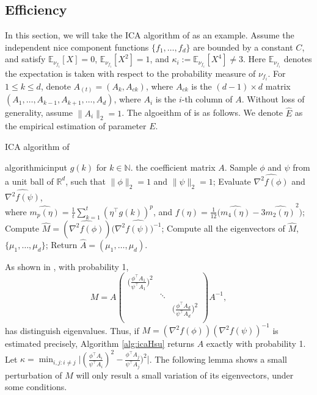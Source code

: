\documentclass[english]{article} %
\newcommand{\E}{\mathbb{E}}
\newcommand{\real}{\mathbb{R}}
\renewcommand{\natural}{\mathbb{N}}
\theoremstyle{plain}
\theoremstyle{remark}
\theoremstyle{claim}
\theoremstyle{plain}
\begin{document}
\subsection{Efficiency}
In this section, we will take the ICA algorithm of \citet{DHsu2012} as an example. 
Assume the independent nice component functions $\{f_1,\ldots,f_d\}$ are bounded by a constant $C$, and satisfy $\E_{\nu_{f_i}}[X]=0$, $\E_{\nu_{f_i}}[X^2]=1$, and $\kappa_i := \E_{\nu_{f_i}}[X^4]\neq 3$. 
Here $\E_{\nu_{f_i}}$ denotes the expectation is taken with respect to the probability measure of $\nu_{f_i}$. 
For $1\le k\le d$, denote $A_{(t)} = (A_k,A_{ck})$, where $A_{ck}$ is the $(d-1)\times d$ matrix $(A_1,\ldots,A_{k-1},A_{k+1},\ldots,A_d)$, where $A_i$ is the $i$-th column of $A$. 
Without loss of generality, assume $\|A_i\|_2=1$.
The algoeithm of \citet{DHsu2012} is as follows. We denote $\widehat{E}$ as the empirical estimation of parameter $E$. 
\begin{algorithm}[H]
\caption{ICA algorithm of \citet{DHsu2012} \label{alg:icaHsu}}
\begin{algorithmic}[1]
\INPUT algorithmicinput $g(k)$ for $k\in\natural$.
\OUTPUT the coefficient matrix $A$. 
\STATE Sample $\phi$ and $\psi$ from a unit ball of $\real^d$, such that $\|\phi\|_2 = 1$ and $\|\psi\|_2 = 1$;
\STATE Evaluate $\widehat{\nabla^2f(\phi)}$ and $\widehat{\nabla^2f(\psi)}$, \\
\quad where $\widehat{m_p(\eta)} = \frac{1}{t}\sum_{k=1}^{t} (\eta^{\top}g(k))^p$, and $f(\eta) = \frac{1}{12}\big(\widehat{m_4(\eta)} - 3\widehat{m_2(\eta)}^2 \big)$;
\STATE Compute $\widehat{M} = (\widehat{\nabla^2f(\phi)})(\widehat{\nabla^2f(\psi))^{-1}}$;
\STATE Compute all the eigenvectors of $\widehat{M}$, $\{\mu_1,\ldots,\mu_d\}$;
\STATE Return $\widehat{A} = (\mu_1,\ldots,\mu_d)$.
\end{algorithmic}
\end{algorithm}

As shown in \citep{DHsu2012}, with probability 1,
\begin{equation}
\label{eq:M}
M = A 
\left(
\begin{array}{ccc}
\big(\frac{\phi^{\top}A_1}{\psi^{\top}A_1}\big)^2 & &\\
    & \ddots & \\
    & & \big(\frac{\phi^{\top}A_d}{\psi^{\top}A_d}\big)^2\\
\end{array} 
\right) 
A^{-1},
\end{equation}
has distinguish eigenvalues. Thus, if $M =(\nabla^2f(\phi))(\nabla^2f(\psi))^{-1} $ is estimated precisely, Algorithm \ref{alg:icaHsu} returns $A$ exactly  with probability 1. 
Let $\kappa =  \min_{i,j: i\neq j} \vert (\frac{\phi^{\top}A_i}{\psi^{\top}A_i})^2 - \frac{\phi^{\top}A_j}{\psi^{\top}A_j})^2 \vert $. The following lemma shows a small perturbation of $M$ will only result a small variation of its eigenvectors, under some conditions.
\end{document}
